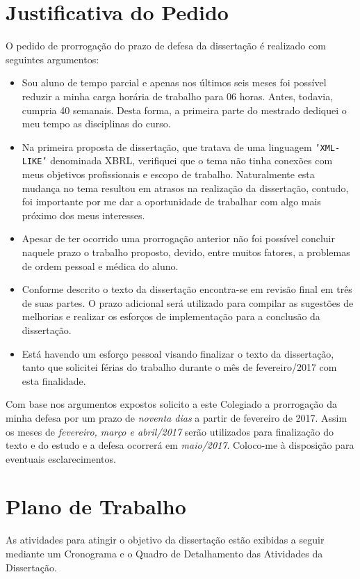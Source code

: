 \documentclass[10pt,a4paper]{report}
\begin{document}
	\chapter{Justificativa do Pedido}
	\label{justificativa}

	O pedido de prorrogação do prazo de defesa da dissertação é realizado com
	seguintes argumentos:

	\begin{itemize}
		\item Sou aluno de tempo parcial e apenas nos últimos seis meses foi
			possível reduzir a minha carga horária de trabalho para 06 horas.
			Antes, todavia, cumpria 40 semanais. Desta forma, a primeira parte do
			mestrado dediquei o meu tempo as disciplinas do curso.
		\item Na primeira proposta de dissertação, que tratava de uma linguagem
			\texttt{'XML-LIKE'} denominada XBRL, verifiquei que o tema não tinha
			conexões com meus objetivos profissionais e escopo de trabalho.
			Naturalmente esta mudança no tema resultou em atrasos na realização da
			dissertação, contudo, foi importante por me dar a oportunidade de
			trabalhar com algo mais próximo dos meus interesses.
		\item Apesar de ter ocorrido uma prorrogação anterior não foi possível
			concluir naquele prazo o trabalho proposto, devido, entre muitos
			fatores, a problemas de ordem pessoal e médica do aluno.
		\item Conforme descrito o texto da dissertação encontra-se em revisão final
			em três de suas partes. O prazo adicional será utilizado para compilar
			as sugestões de melhorias e realizar os esforços de implementação para a
			conclusão da dissertação.
		\item Está havendo um esforço pessoal visando finalizar o texto da
			dissertação, tanto que solicitei férias do trabalho durante o mês de
			fevereiro/2017 com esta finalidade.
	\end{itemize}

	Com base nos argumentos expostos solicito a este Colegiado a prorrogação da
	minha defesa por um prazo de \textit{noventa dias} a partir de fevereiro de
	2017. Assim os meses de \textit{fevereiro, março e abril/2017} serão utilizados
para finalização do texto e do estudo e a defesa ocorrerá em \textit{maio/2017}.
Coloco-me à disposição para eventuais esclarecimentos.

\chapter{Plano de Trabalho}
\label{Plano_de_Trabalho}

As atividades para atingir o objetivo da dissertação estão exibidas a seguir
mediante um Cronograma e o Quadro de Detalhamento das Atividades da
Dissertação.






\end{document}
